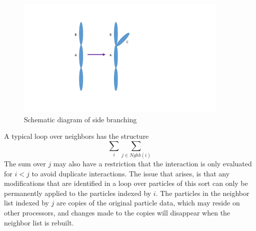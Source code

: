 \documentclass[12pt]{article}
\begin{document}
\begin{figure}
\centering
\includegraphics[width=4.0in,keepaspectratio=true]{side_branch}
\caption{\label{fig:side_branch} Schematic diagram of side branching}
\end{figure}

A typical loop over neighbors has the structure
\[
\sum_{i}\sum_{j\in Nghb(i)}
\]
The sum over $j$ may also have a restriction that the interaction is only evaluated
for $i<j$ to avoid duplicate interactions. The issue that arises, is that any
modifications that are identified in a loop over particles of this sort can only
be permanently applied to the particles indexed by $i$. The particles in the neighbor list
indexed by $j$ are copies of the original particle data, which may reside on other
processors, and changes made to the copies will disappear when the neighbor list is rebuilt.
\end{document}

